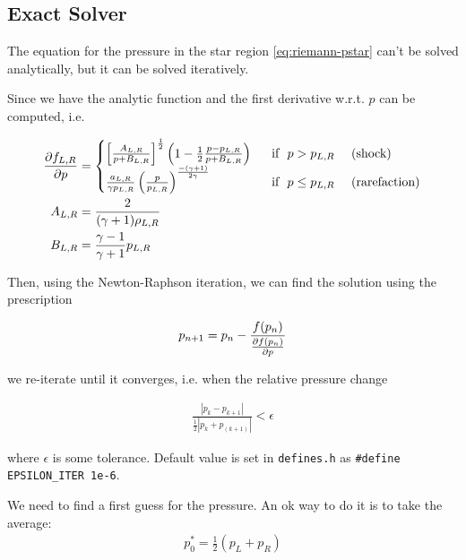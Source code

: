 \subsection{Exact Solver}


The equation for the pressure in the star region \ref{eq:riemann-pstar} can't be solved analytically, but it can be solved iteratively.

Since we have the analytic function and the first derivative w.r.t. $p$ can be computed, i.e.

\begin{align*}
	\frac{\partial f_{L,R}}{\partial p} &= 
		\begin{cases}
			\left[ \frac{A_{L,R}}{p + B_{L,R}} \right]^{\frac{1}{2}} \left( 1 - \frac{1}{2} \frac{p - p_{L,R}}{p + B_{L,R}} \right) 
				& ~\text{ if } ~ p > p_{L,R} ~ \quad \text{(shock)} \\
			\frac{a_{L,R}}{\gamma p_{L,R}}  \left( \frac{p}{p_{L,R}} \right)^ \frac{-(\gamma+1)}{2 \gamma}
				& ~\text{ if } ~ p \leq p_{L,R} ~ \quad \text{(rarefaction)} \label{eq:riemann-pstar-dp}\\
		\end{cases} \\
	A_{L,R} &= 
		\frac{2}{(\gamma + 1) \rho_{L,R}}\\
	B_{L,R} &= 
		\frac{\gamma - 1}{\gamma + 1} p_{L,R}
\end{align*}


Then, using the Newton-Raphson iteration, we can find the solution using the prescription

\begin{align}
	p_{n+1} = p_n - \frac{f(p_n)}{\frac{\partial f(p_n)}{\partial p}}
\end{align}


we re-iterate until it converges, i.e. when the relative pressure change 

\begin{align}
	\frac{|p_k - p_{k+1}|}{\frac{1}{2} | p_k + p_(k+1) | } < \epsilon
\end{align}

where $\epsilon$ is some tolerance. Default value is set in \texttt{defines.h} as \texttt{\#define EPSILON\_ITER 1e-6}.


We need to find a first guess for the pressure. 
An ok way to do it is to take the average:
\begin{align*}
	p_0^* = \frac{1}{2} (p_L + p_R)
\end{align*}

